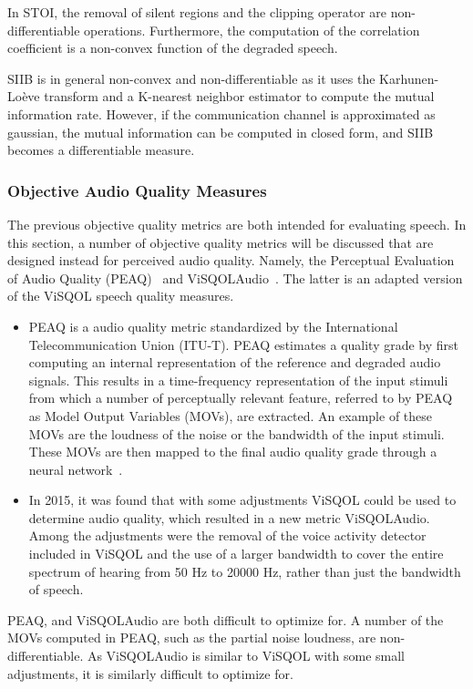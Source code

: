 In STOI, the removal of silent regions and the clipping operator are non-differentiable operations.
Furthermore, the computation of the correlation coefficient is a non-convex function of the degraded speech.

SIIB is in general non-convex and non-differentiable as it uses the Karhunen-Lo\`eve transform and a 
K-nearest neighbor estimator to compute the mutual information rate.
However, if the communication channel is approximated as gaussian, the mutual information can be computed in closed form,
and SIIB becomes a differentiable measure.

\subsubsection{Objective Audio Quality Measures}
The previous objective quality metrics are both intended for evaluating speech.
In this section, a number of objective quality metrics will be discussed that are designed instead 
for perceived audio quality.
Namely, the Perceptual Evaluation of Audio Quality (PEAQ)~\cite{thiede2000peaq} 
and ViSQOLAudio~\cite{hines2015visqolaudio}.
The latter is an adapted version of the ViSQOL speech quality measures.

\begin{itemize}
    \item 
PEAQ is a audio quality metric standardized by the International Telecommunication Union (ITU-T).
PEAQ estimates a quality grade by first computing an internal representation  of
the reference and degraded audio signals.
This results in a time-frequency representation of the input stimuli from which a number of perceptually relevant feature,
referred to by PEAQ as Model Output Variables (MOVs), are extracted.
An example of these MOVs are the loudness of the noise or the bandwidth of the input stimuli.
These MOVs are then mapped to the final audio quality grade through a neural network~\cite{thiede2000peaq}.
    \item 
In 2015, it was found that with some adjustments ViSQOL could be used to determine audio quality, which resulted in a 
new metric ViSQOLAudio.
Among the adjustments were the removal of the voice activity detector included in ViSQOL and the use of a larger bandwidth
to cover the entire spectrum of hearing from 50 Hz to 20000 Hz, rather than just the bandwidth of speech.
\end{itemize}

PEAQ, and ViSQOLAudio are both difficult to optimize for.
A number of the MOVs computed in PEAQ, such as the partial noise loudness, are non-differentiable.
As ViSQOLAudio is similar to ViSQOL with some small adjustments, it is similarly difficult to optimize for.

